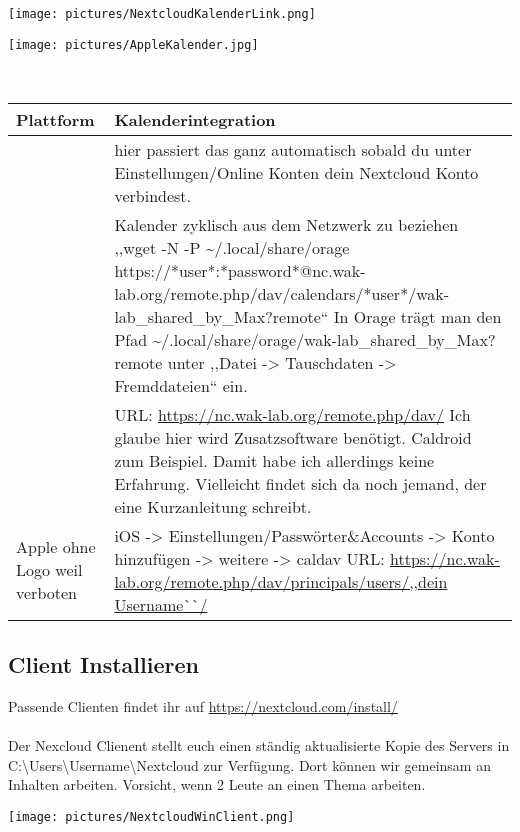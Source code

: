 \begin{minipage}[t]{0.5\textwidth}
  \centering
  \texttt{[image: pictures/NextcloudKalenderLink.png]}
  \label{img:NextcloudKalenderLink}
\end{minipage}
\begin{minipage}[t]{0.5\textwidth}
  \centering
  \texttt{[image: pictures/AppleKalender.jpg]}
  \label{img:AppleKalender}
\end{minipage}
\ \\


\begin{raggedright}
\begin{tabular}{|p{2.3cm}|p{}|}
\hline
\textbf{Plattform} & \textbf{Kalenderintegration}\\
\hline
\vspace{-0.2cm}{\texttt{[image: pictures/ubuntu.png]}} & hier passiert das ganz automatisch sobald du unter Einstellungen/Online Konten dein Nextcloud Konto verbindest.\\
\hline
\vspace{-0.2cm}{\texttt{[image: pictures/xubuntu.jpg]}} & Kalender zyklisch aus dem Netzwerk zu beziehen ,,wget -N -P \textasciitilde /.local/share/orage https://*user*:*password*@nc.wak-lab.org/remote.php/dav/calendars/*user*/wak-lab\_shared\_by\_Max?remote`` In Orage trägt man den Pfad \textasciitilde /.local/share/orage/wak-lab\_shared\_by\_Max?remote unter ,,Datei -> Tauschdaten -> Fremddateien`` ein.\\
\hline
\vspace{-0.2cm}{\texttt{[image: pictures/android.png]}} & URL: \url{https://nc.wak-lab.org/remote.php/dav/} Ich glaube hier wird Zusatzsoftware benötigt. Caldroid zum Beispiel. Damit habe ich allerdings keine Erfahrung. Vielleicht findet sich da noch jemand, der eine Kurzanleitung schreibt.\\
\hline
Apple ohne Logo weil verboten & iOS -> Einstellungen/Passwörter\&Accounts  -> Konto hinzufügen -> weitere -> caldav URL: \url{https://nc.wak-lab.org/remote.php/dav/principals/users/,,dein Username``/}\\
\hline
\end{tabular}
\label{tab:NexcloudKalenderClient}
\end{raggedright}


\subsection{Client Installieren}
Passende Clienten findet ihr auf \url{https://nextcloud.com/install/}\\
\ \\
Der Nexcloud Clienent stellt euch einen ständig aktualisierte Kopie des Servers in C:\textbackslash Users\textbackslash Username\textbackslash Nextcloud zur Verfügung. Dort können wir gemeinsam an Inhalten arbeiten. Vorsicht, wenn 2 Leute an einen Thema arbeiten.\\
 
\begin{minipage}[t]{\textwidth}
  \centering
  \texttt{[image: pictures/NextcloudWinClient.png]}
  \label{img:NextcloudWinClient}
\end{minipage}





